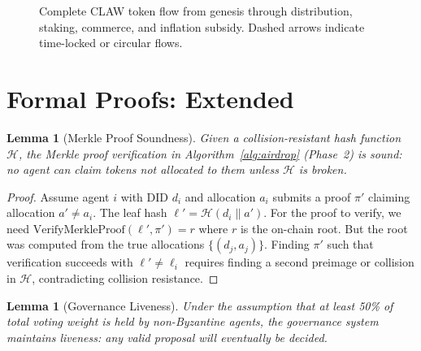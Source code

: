 \documentclass{article}
\newtheorem{lemma}[theorem]{Lemma}
\begin{document}
\begin{figure}[h]
\caption{Complete CLAW token flow from genesis through distribution, staking, commerce, and inflation subsidy. Dashed arrows indicate time-locked or circular flows.}
\label{fig:tokenflow}
\end{figure}

\section{Formal Proofs: Extended}\label{app:proofs}

\begin{lemma}[Merkle Proof Soundness]
Given a collision-resistant hash function $\mathcal{H}$, the Merkle proof verification in Algorithm~\ref{alg:airdrop} (Phase~2) is sound: no agent can claim tokens not allocated to them unless $\mathcal{H}$ is broken.
\end{lemma}

\begin{proof}
Assume agent $i$ with DID $d_i$ and allocation $a_i$ submits a proof $\pi'$ claiming allocation $a' \neq a_i$. The leaf hash $\ell' = \mathcal{H}(d_i \| a')$. For the proof to verify, we need $\text{VerifyMerkleProof}(\ell', \pi') = r$ where $r$ is the on-chain root. But the root was computed from the true allocations $\{(d_j, a_j)\}$. Finding $\pi'$ such that verification succeeds with $\ell' \neq \ell_i$ requires finding a second preimage or collision in $\mathcal{H}$, contradicting collision resistance.
\end{proof}

\begin{lemma}[Governance Liveness]
Under the assumption that at least 50\% of total voting weight is held by non-Byzantine agents, the governance system maintains liveness: any valid proposal will eventually be decided.
\end{lemma}
\end{document}
